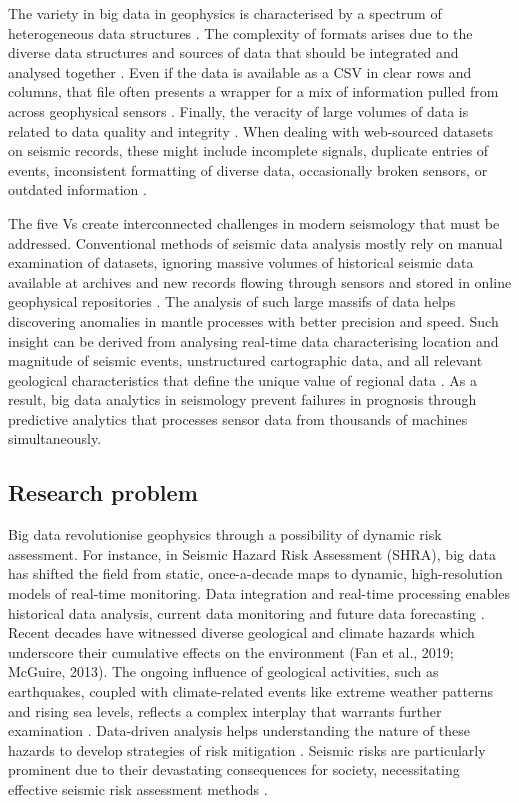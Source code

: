 \documentclass[data,article,submit,pdftex,moreauthors]{Definitions/mdpi}
\begin{document}
The variety in big data in geophysics is characterised by a spectrum of heterogeneous data structures \cite{li2016big, wang2019geophysical}. The complexity of formats arises due to the diverse data structures and sources of data that should be integrated and analysed together \cite{chen2014big}. Even if the data is available as a CSV in clear rows and columns, that file often presents a wrapper for a mix of information pulled from across geophysical sensors \cite{ma2015big,kessler2019data}. Finally, the veracity of large volumes of data is related to data quality and integrity \cite{fang2015big,reyes2017data}. When dealing with web-sourced datasets on seismic records, these might include incomplete signals, duplicate entries of events, inconsistent formatting of diverse data, occasionally broken sensors, or outdated information \cite{mousavi2019cred}.

The five Vs create interconnected challenges in modern seismology that must be addressed. Conventional methods of seismic data analysis mostly rely on manual examination of datasets, ignoring massive volumes of historical seismic data available at archives and new records flowing through sensors and stored in online geophysical repositories \cite{kong2019machine}. The analysis of such large massifs of data helps discovering anomalies in mantle processes with better precision and speed. Such insight can be derived from analysing real-time data characterising location and magnitude of seismic events, unstructured cartographic data, and all relevant geological characteristics that define the unique value of regional data \cite{perol2018convolutional,zhu2019phasenet}. As a result, big data analytics in seismology prevent failures in prognosis through predictive analytics that processes sensor data from thousands of machines simultaneously.

\subsection{Research problem}

Big data revolutionise geophysics through a possibility of dynamic risk assessment. For instance, in Seismic Hazard Risk Assessment (SHRA), big data has shifted the field from static, once-a-decade maps to dynamic, high-resolution models of real-time monitoring. Data integration and real-time processing enables historical data analysis, current data monitoring and future data forecasting \cite{Sen2009}. Recent decades have witnessed diverse geological and climate hazards which underscore their cumulative effects on the environment (Fan et al., 2019; McGuire, 2013). The ongoing influence of geological activities, such as earthquakes, coupled with climate-related events like extreme weather patterns and rising sea levels, reflects a complex interplay that warrants further examination \cite{Liggins2013}. Data-driven analysis helps understanding the nature of these hazards to develop strategies of risk mitigation \cite{DeSalvio2023,Glasgow2021}. Seismic risks are particularly prominent due to their devastating consequences for society, necessitating effective seismic risk assessment methods \cite{Dowrick2009,Liu2024}. 
\end{document}
